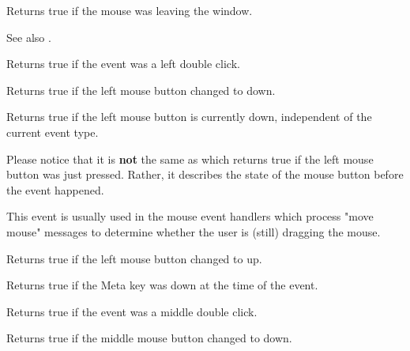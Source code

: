 
Returns true if the mouse was leaving the window.

See also .



Returns true if the event was a left double click.

\label{wxmouseeventleftdown}


Returns true if the left mouse button changed to down.

\label{wxmouseeventleftisdown}


Returns true if the left mouse button is currently down, independent
of the current event type.

Please notice that it is {\bf not} the same as
 which returns true if the left mouse
button was just pressed. Rather, it describes the state of the mouse button
before the event happened.

This event is usually used in the mouse event handlers which process "move
mouse" messages to determine whether the user is (still) dragging the mouse.



Returns true if the left mouse button changed to up.



Returns true if the Meta key was down at the time of the event.



Returns true if the event was a middle double click.



Returns true if the middle mouse button changed to down.


